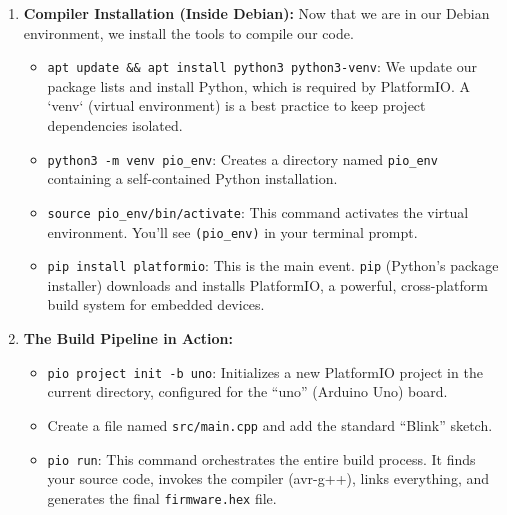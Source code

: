 \documentclass[11pt,a4paper]{article}
\begin{document}
\begin{itemize}
\begin{enumerate}[label=\arabic*.]
        \begin{itemize}
            \item \verb|pkg install proot-distro|: This installs the tool that manages these Linux subsystems.
            \item \verb|proot-distro install debian|: This downloads and sets up a minimal Debian Linux environment inside a folder in Termux. It is completely isolated from your core Android system.
            \item \verb|proot-distro login debian|: This command ``enters'' the Debian environment. Your terminal prompt will change, indicating you are now operating inside Debian.
        \end{itemize}
        \item \textbf{Compiler Installation (Inside Debian):} Now that we are in our Debian environment, we install the tools to compile our code.
        \begin{itemize}
            \item \verb|apt update && apt install python3 python3-venv|: We update our package lists and install Python, which is required by PlatformIO. A `venv` (virtual environment) is a best practice to keep project dependencies isolated.
            \item \verb|python3 -m venv pio_env|: Creates a directory named \verb|pio_env| containing a self-contained Python installation.
            \item \verb|source pio_env/bin/activate|: This command activates the virtual environment. You'll see \verb|(pio_env)| in your terminal prompt.
            \item \verb|pip install platformio|: This is the main event. \verb|pip| (Python's package installer) downloads and installs PlatformIO, a powerful, cross-platform build system for embedded devices.
        \end{itemize}
        \item \textbf{The Build Pipeline in Action:}
        \begin{itemize}
            \item \verb|pio project init -b uno|: Initializes a new PlatformIO project in the current directory, configured for the ``uno'' (Arduino Uno) board.
            \item Create a file named \verb|src/main.cpp| and add the standard ``Blink'' sketch.
            \item \verb|pio run|: This command orchestrates the entire build process. It finds your source code, invokes the compiler (avr-g++), links everything, and generates the final \verb|firmware.hex| file.

\end{itemize}
\end{enumerate}
\end{itemize}
\end{document}

